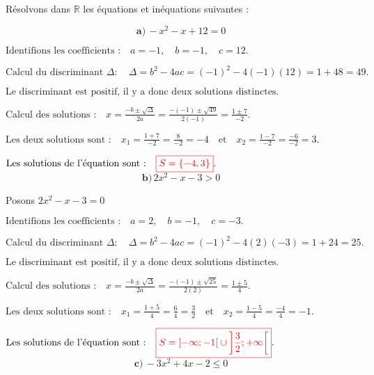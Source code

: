 \documentclass[12pt,a4paper]{article}
\begin{document}
Résolvons dans \(\mathbb{R}\) les équations et inéquations suivantes :


\[ \textbf{a)} \, -x^2 - x + 12 = 0 \]

\(
\text{Identifions les coefficients :} \quad a = -1, \quad b = -1, \quad c = 12.
\)

\(
\text{Calcul du discriminant } \Delta : \quad
\Delta = b^2 - 4ac = (-1)^2 - 4(-1)(12) = 1 + 48 = 49.
\)

\(
\text{Le discriminant est positif, il y a donc deux solutions distinctes.}
\)

\(
\text{Calcul des solutions :} \quad
x = \frac{-b \pm \sqrt{\Delta}}{2a} = \frac{-(-1) \pm \sqrt{49}}{2(-1)} = \frac{1 \pm 7}{-2}.
\)

\(
\text{Les deux solutions sont :} \quad
x_1 = \frac{1 + 7}{-2} = \frac{8}{-2} = -4 \quad \text{et} \quad x_2 = \frac{1 - 7}{-2} = \frac{-6}{-2} = 3.
\)

\(
\text{Les solutions de l'équation sont :} \quad
\textcolor{red}{\boxed{S=\left\lbrace  -4 , 3\right\rbrace  }}.
\)
\\
\[
\textbf{b)} \, 2x^2 - x - 3 > 0
\]

Posons \( 2x^2 - x - 3 = 0 \)

\(
\text{Identifions les coefficients :} \quad a = 2, \quad b = -1, \quad c = -3.
\)

\(
\text{Calcul du discriminant } \Delta : \quad
\Delta = b^2 - 4ac = (-1)^2 - 4(2)(-3) = 1 + 24  = 25.
\)

\(
\text{Le discriminant est positif, il y a donc deux solutions distinctes.}
\)

\(
\text{Calcul des solutions :} \quad
x = \frac{-b \pm \sqrt{\Delta}}{2a} = \frac{-(-1) \pm \sqrt{25}}{2(2)} = \frac{1 \pm 5}{4}.
\)

\(
\text{Les deux solutions sont :} \quad
x_1 = \frac{1 + 5}{4} = \frac{6}{4} = \frac{3}{2} \quad \text{et} \quad x_2 = \frac{1 - 5}{4} = \frac{-4}{4} = -1.
\)


\(
\text{Les solutions de l'équation sont :} \quad
\textcolor{red}{\boxed{S=\left]-\infty;-1 \right[ \cup\left] \frac{3}{2};+\infty \right[ }}.
\)
\\
\[ \textbf{c)} \, -3x^2 + 4x - 2 \leq 0 \]
\end{document}
